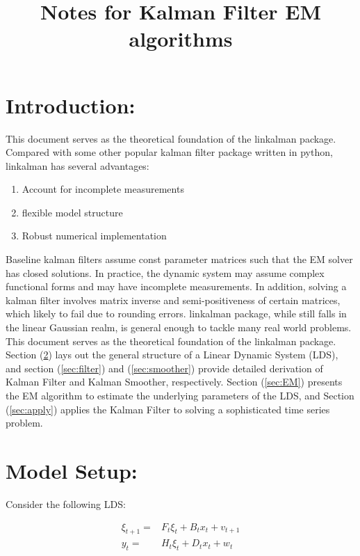 \documentclass[12pt]{article}
\newenvironment{boenumerate}
    {\begin{enumerate}\renewcommand\labelenumi{\textbf\theenumi}}
    {\end{enumerate}}
\numberwithin{equation}{section}
\begin{document}
\title{Notes for Kalman Filter EM algorithms}

\section{Introduction:}

This document serves as the theoretical foundation of the linkalman package. Compared with some other popular kalman filter package written in python, linkalman has several advantages:

\begin{boenumerate}
    \item Account for incomplete measurements 
    \item flexible model structure
    \item Robust numerical implementation
\end{boenumerate}

Baseline kalman filters assume const parameter matrices such that the EM solver has closed solutions. In practice, the dynamic system may assume complex functional forms and may have incomplete measurements. In addition, solving a kalman filter involves matrix inverse and semi-positiveness of certain matrices, which likely to fail due to rounding errors. linkalman package, while still falls in the linear Gaussian realm, is general enough to tackle many real world problems. This document serves as the theoretical foundation of the linkalman package. Section (\ref{sec:model_setup}) lays out the general structure of a Linear Dynamic System (LDS), and section (\ref{sec:filter}) and (\ref{sec:smoother}) provide detailed derivation of Kalman Filter and Kalman Smoother, respectively. Section (\ref{sec:EM}) presents the EM algorithm to estimate the underlying parameters of the LDS, and Section (\ref{sec:apply}) applies the Kalman Filter to solving a sophisticated time series problem. 

\section{Model Setup:} \label{sec:model_setup}

Consider the following LDS:

\begin{align}
    \xi_{t+1} = & F_{t}\xi_{t} + B_{t}x_t + v_{t+1} \label{eq:state_evolve} \\
    y_t = & H_t\xi_{t} + D_{t}x_t + w_t \label{eq:measure}
\end{align}
\end{document}

